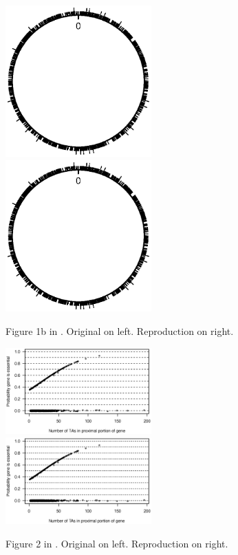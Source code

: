 \begin{figure}
\includegraphics[viewport=179 299 438 517, width=0.50\textwidth]{../talk/Figs/circlefig.ps}
\hfill
\includegraphics[viewport=179 299 438 517, width=0.50\textwidth]{../reproduction/Figs/circlefig.ps}

\caption{Figure 1b in \citet{lamichhane2003}. Original on left. Reproduction on right.\label{fig:fig1b}}
\end{figure}

\begin{figure}
\includegraphics[viewport=44 245 525 508, width=0.50\textwidth]{../original/Nov02/R/Figs/fig2.ps}
\hfill
\includegraphics[viewport=44 245 525 508, width=0.50\textwidth]{../reproduction/Figs/fig2.ps}

\caption{Figure 2 in \citet{lamichhane2003}. Original on left. Reproduction on right.\label{fig:fig2}}
\end{figure}



